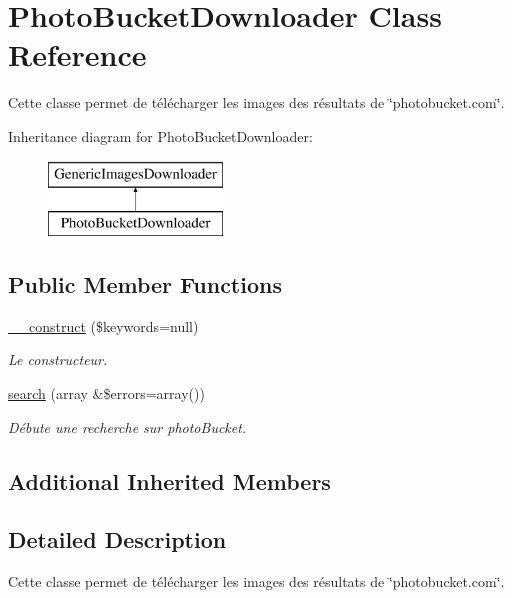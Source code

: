 \hypertarget{class_photo_bucket_downloader}{\section{Photo\-Bucket\-Downloader Class Reference}
\label{class_photo_bucket_downloader}
}


Cette classe permet de télécharger les images des résultats de \char`\"{}photobucket.\-com\char`\"{}.  


Inheritance diagram for Photo\-Bucket\-Downloader\-:\begin{figure}[H]
\begin{center}
\leavevmode
\includegraphics[height=2.000000cm]{class_photo_bucket_downloader}
\end{center}
\end{figure}
\subsection*{Public Member Functions}
\begin{DoxyCompactItemize}
\item 
\hyperlink{class_photo_bucket_downloader_af7a671cb2bc664328fb5224f0da6ef60}{\-\_\-\-\_\-construct} (\$keywords=null)
\begin{DoxyCompactList}\small\item\em Le constructeur. \end{DoxyCompactList}\item 
\hyperlink{class_photo_bucket_downloader_aeaf78020730e78dd35d16d14b527b44c}{search} (array \&\$errors=array())
\begin{DoxyCompactList}\small\item\em Débute une recherche sur photo\-Bucket. \end{DoxyCompactList}\end{DoxyCompactItemize}
\subsection*{Additional Inherited Members}


\subsection{Detailed Description}
Cette classe permet de télécharger les images des résultats de \char`\"{}photobucket.\-com\char`\"{}. 

